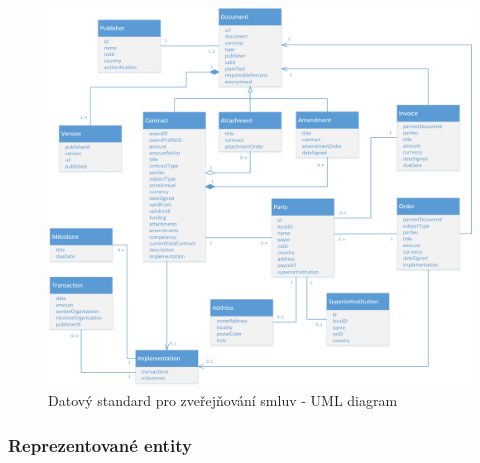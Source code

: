 \begin{figure}[H]
\centerline{\includegraphics[width=\textwidth]{img/standardDatamodel.eps}}
\caption{Datový standard pro zveřejňování smluv - UML diagram}
\label{obr:standardDatamodel}
\end{figure}

\subsubsection*{Reprezentované entity}

